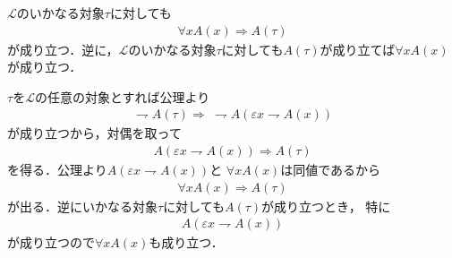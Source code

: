 	
	\begin{screen}
		\begin{metathm}
			$\mathcal{L}$のいかなる対象$\tau$に対しても
			\begin{align}
				\forall x A(x) \Longrightarrow A(\tau)
			\end{align}
			が成り立つ．逆に，$\mathcal{L}$のいかなる対象$\tau$に対しても$A(\tau)$が成り立てば$\forall x A(x)$が成り立つ．
		\end{metathm}
	\end{screen}
	
	\begin{prf}
		$\tau$を$\mathcal{L}$の任意の対象とすれば公理より
		\begin{align}
			\rightharpoondown A(\tau) \Longrightarrow\ \rightharpoondown A
			\left( \varepsilon x \rightharpoondown A(x) \right)
		\end{align}
		が成り立つから，対偶を取って
		\begin{align}
			A \left( \varepsilon x \rightharpoondown A(x) \right)
			\Longrightarrow A(\tau)
		\end{align}
		を得る．公理より$A \left( \varepsilon x \rightharpoondown A(x) \right)$と
		$\forall x A(x)$は同値であるから
		\begin{align}
			\forall x A(x) \Longrightarrow A(\tau)
		\end{align}
		が出る．逆にいかなる対象$\tau$に対しても$A(\tau)$が成り立つとき，
		特に
		\begin{align}
			A \left( \varepsilon x \rightharpoondown A(x) \right)
		\end{align}
		が成り立つので$\forall x A(x)$も成り立つ．
		\QED
	\end{prf}
	
